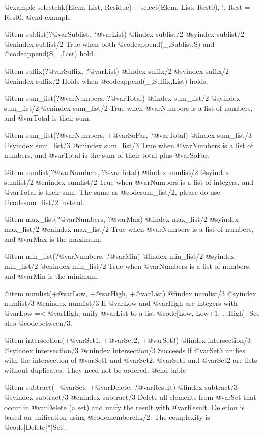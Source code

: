 {{{{{{{{{@example
selectchk(Elem, List, Residue) :-
        select(Elem, List, Rest0), !,
        Rest = Rest0.
@end example

 
@item sublist(?@var{Sublist}, ?@var{List})
@findex sublist/2
@syindex sublist/2
@cnindex sublist/2
True when both @code{append(_,Sublist,S)} and @code{append(S,_,List)} hold.
 
@item suffix(?@var{Suffix}, ?@var{List})
@findex suffix/2
@syindex suffix/2
@cnindex suffix/2
Holds when @code{append(_,Suffix,List)} holds.

@item sum_list(?@var{Numbers}, ?@var{Total})
@findex sum_list/2
@syindex sum_list/2
@cnindex sum_list/2
True when @var{Numbers} is a list of numbers, and @var{Total} is their sum.

@item sum_list(?@var{Numbers}, +@var{SoFar}, ?@var{Total})
@findex sum_list/3
@syindex sum_list/3
@cnindex sum_list/3
True when @var{Numbers} is a list of numbers, and @var{Total} is the sum of their total plus @var{SoFar}.

@item sumlist(?@var{Numbers}, ?@var{Total})
@findex sumlist/2
@syindex sumlist/2
@cnindex sumlist/2
True when @var{Numbers} is a list of integers, and @var{Total} is their
sum. The same as @code{sum_list/2}, please do use @code{sum_list/2}
instead.

@item max_list(?@var{Numbers}, ?@var{Max})
@findex max_list/2
@syindex max_list/2
@cnindex max_list/2
True when @var{Numbers} is a list of numbers, and @var{Max} is the maximum.

@item min_list(?@var{Numbers}, ?@var{Min})
@findex min_list/2
@syindex min_list/2
@cnindex min_list/2
True when @var{Numbers} is a list of numbers, and @var{Min} is the minimum.

@item numlist(+@var{Low}, +@var{High}, +@var{List})
@findex numlist/3
@syindex numlist/3
@cnindex numlist/3
If @var{Low} and @var{High} are integers with @var{Low} =<
@var{High}, unify @var{List} to a list @code{[Low, Low+1, ...High]}. See
also @code{between/3}.

@item intersection(+@var{Set1}, +@var{Set2}, +@var{Set3})
@findex intersection/3
@syindex intersection/3
@cnindex intersection/3
Succeeds if @var{Set3} unifies with the intersection of @var{Set1} and
@var{Set2}. @var{Set1} and @var{Set2} are lists without duplicates. They
need not be ordered.
@end table

@item subtract(+@var{Set}, +@var{Delete}, ?@var{Result})
@findex subtract/3
@syindex subtract/3
@cnindex subtract/3
Delete all elements from @var{Set} that   occur  in @var{Delete} (a set)
and unify the  result  with  @var{Result}.   Deletion  is  based  on
unification using @code{memberchk/2}. The complexity is
@code{|Delete|*|Set|}.

}}}}}}}}}

